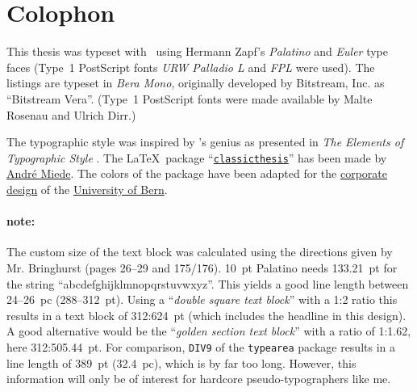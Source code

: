 \pagestyle{empty}

\hfill

\vfill


\section*{Colophon}
This thesis was typeset with \LaTeXe\ using Hermann Zapf's \emph{Palatino} and \emph{Euler} type faces (Type~1 PostScript fonts \emph{URW Palladio L} and \emph{FPL} were used). The listings are typeset in \emph{Bera Mono}, originally developed by Bitstream, Inc. as ``Bitstream Vera''. (Type~1 PostScript fonts were made available by Malte Rosenau and Ulrich Dirr.)

The typographic style was inspired by 's genius as presented in \emph{The Elements of Typographic Style} \citep{bringhurst:2002}. The \LaTeX\ package ``\href{http://www.ctan.org/tex-archive/macros/latex/contrib/classicthesis/}{\texttt{classicthesis}}'' has been made by \href{http://www.miede.de}{André Miede}. The colors of the package have been adapted for the \href{http://www.kommunikation.unibe.ch/intern/content/beratung/corporate_design/logo_schriften__farben/}{corporate design} of the \href{http://www.unibe.ch/}{University of Bern}.

\paragraph{note:} The custom size of the text block was calculated using the directions given by Mr. Bringhurst (pages 26--29 and 175/176). 10~pt Palatino needs  133.21~pt for the string ``abcdefghijklmnopqrstuvwxyz''. This yields a good line length between 24--26~pc (288--312~pt). Using a ``\emph{double square text block}'' with a 1:2 ratio this results in a text block of 312:624~pt (which includes the headline in this design). A good alternative would be the ``\emph{golden section text block}'' with a ratio of 1:1.62, here 312:505.44~pt. For comparison, \texttt{DIV9} of the \texttt{typearea} package results in a line length of 389~pt (32.4~pc), which is by far too long. However, this information will only be of interest for hardcore pseudo-typographers like me.
%
%

\bigskip

\noindent\finalVersionString